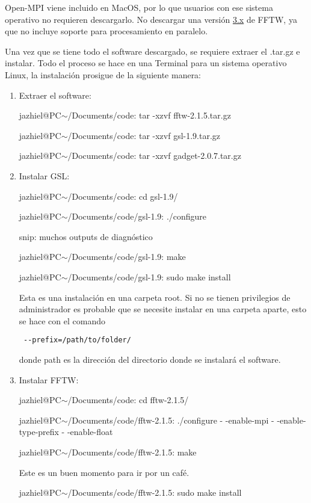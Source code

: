 \documentclass[a4paper,openright,10pt, oneside, final]{book}
\begin{document}
\textsf{Open-MPI} viene incluido en MacOS, por lo que usuarios con ese sistema operativo no requieren descargarlo. No descargar una versión \underline{3.x} de FFTW, ya que no incluye soporte para procesamiento en paralelo.

Una vez que se tiene todo el software descargado, se requiere extraer el \textsf{.tar.gz} e instalar. Todo el proceso se hace en una Terminal para un sistema operativo Linux, la instalación prosigue de la siguiente manera:
\begin{enumerate}
\item Extraer el software:

\textsf{jazhiel@PC$\sim$/Documents/code: tar -xzvf fftw-2.1.5.tar.gz}

\textsf{jazhiel@PC$\sim$/Documents/code: tar -xzvf gsl-1.9.tar.gz}

\textsf{jazhiel@PC$\sim$/Documents/code: tar -xzvf gadget-2.0.7.tar.gz}

\item Instalar GSL:

\textsf{jazhiel@PC$\sim$/Documents/code: cd gsl-1.9/}

\textsf{jazhiel@PC$\sim$/Documents/code/gsl-1.9: ./configure}

\textsf{snip: muchos outputs de diagnóstico}

\textsf{jazhiel@PC$\sim$/Documents/code/gsl-1.9: make}

\textsf{jazhiel@PC$\sim$/Documents/code/gsl-1.9: sudo make install}

Esta es una instalación en una carpeta \textsf{root}. Si no se tienen privilegios de administrador es probable que se necesite instalar en una carpeta aparte, esto se hace con el comando \begin{verbatim} --prefix=/path/to/folder/
\end{verbatim}  donde \textsf{path} es la dirección del directorio donde se instalará el software.

\item Instalar FFTW:

\textsf{jazhiel@PC$\sim$/Documents/code: cd fftw-2.1.5/}

\textsf{jazhiel@PC$\sim$/Documents/code/fftw-2.1.5: ./configure - -enable-mpi - -enable-type-prefix - -enable-float}

\textsf{jazhiel@PC$\sim$/Documents/code/fftw-2.1.5: make}

\textsf{Este es un buen momento para ir por un café.}

\textsf{jazhiel@PC$\sim$/Documents/code/fftw-2.1.5: sudo make install}


\end{enumerate}
\end{document}
